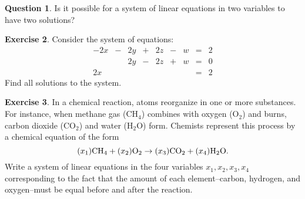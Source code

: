 \documentclass{beamer}
\theoremstyle{definition}
\newtheorem{exercise}{Exercise}
\newtheorem{question}[exercise]{Question}
\begin{document}
\begin{frame}{\insertframenumber}
\begin{question}
	Is it possible for a system of linear equations in two variables to have two solutions?
\end{question}
\end{frame}

\begin{frame}{\insertframenumber}
\begin{exercise}
	Consider the system of equations:
	$$\begin{array}{rcrcrcrcr}
		-2x&-&2y&+&2z&-&w &=& 2\\
		&&2y&-&2z&+&w&=&0\\
		2x&&&&&&&=&2
		\end{array}$$
	Find all solutions to the system.
\end{exercise}
\end{frame}

\begin{frame}{\insertframenumber}
\begin{exercise}
	In a chemical reaction, atoms reorganize in one or more substances.  For instance, when methane gas (CH$_4$) combines with oxygen (O$_2$) and burns, carbon dioxide (CO$_2$) and water (H$_2$O) form.  Chemists represent this process by a chemical equation of the form	
		\[(x_1)\textup{CH}_4+(x_2)\textup{O}_2\rightarrow(x_3)\textup{CO}_2 + (x_4)\textup{H}_2\textup{O}.\]
	Write a system of linear equations in the four variables $x_1,x_2,x_3,x_4$ corresponding to the fact that the amount of each element--carbon, hydrogen, and oxygen--must be equal before and after the reaction.
\end{exercise}
\end{frame}
\end{document}
